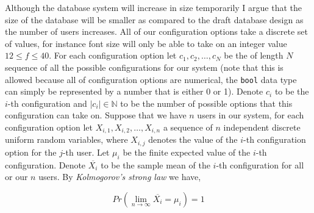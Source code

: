 Although the
database system will increase in size temporarily I argue that
the size of the database will be smaller as compared to the 
draft database design as the number of users increases. All of
our configuration options take a discrete set of values, for 
instance font size will only be able to take on an integer
value $12 \leq f \leq 40$. For each configuration option let
$c_1, c_2, \ldots, c_N$ be the of length $N$ sequence of all
the possible configurations for our 
system (note that this is allowed because all of configuration
options are numerical, the \texttt{bool} data type can simply
be represented by a number that is either 0 or 1). Denote
$c_i$ to be the $i$-th configuration and $|c_i| \in \mathbb{N}$
to be the number of possible options that this configuration 
can take on. Suppose that we have $n$ users in our system,
for each configuration option let
$X_{i, 1}, X_{i, 2}, \ldots, X_{i, n}$ a sequence of $n$
independent discrete uniform random variables, 
where $X_{i, j}$ denotes the value of the $i$-th configuration
option for the $j$-th user. Let $\mu_i$ be the finite expected
value of the $i$-th configuration. Denote $\overline{X_i}$ to 
be the sample mean of the $i$-th configuration for all or our
$n$ users. By \textit{Kolmogorov's strong law} \cite{thm}
we have,

\begin{equation} \label{eq:kol}
  Pr \left(\lim_{n \to \infty} \overline{X_i} = \mu_i \right) = 1
\end{equation}

